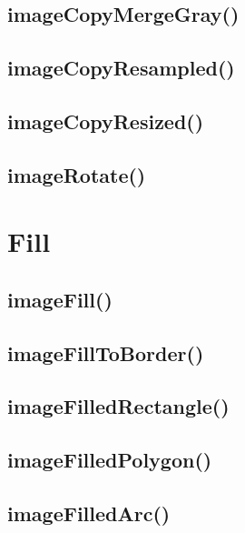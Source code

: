 \subsection{imageCopyMergeGray()}



\subsection{imageCopyResampled()}




\subsection{imageCopyResized()}


\subsection{imageRotate()}







\section{Fill}



\subsection{imageFill()}




\subsection{imageFillToBorder()}



\subsection{imageFilledRectangle()}





\subsection{imageFilledPolygon()}




\subsection{imageFilledArc()}



